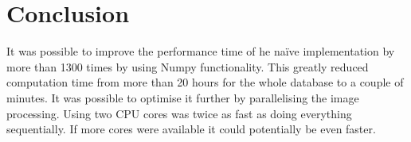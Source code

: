 \section{Conclusion}
It was possible to improve the performance time of he na\"ive implementation by more than 1300 times by using Numpy functionality. This greatly reduced computation time from more than 20 hours for the whole database to a couple of minutes. It was possible to optimise it further by parallelising the image processing. Using two CPU cores was twice as fast as doing everything sequentially. If more cores were available it could potentially be even faster.